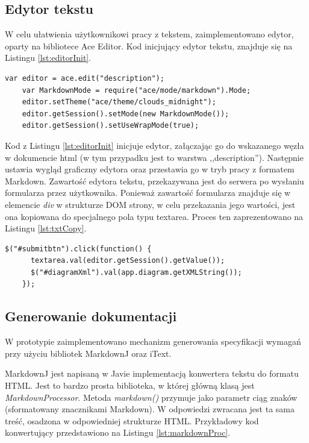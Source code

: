     \newpage

    \subsection{Edytor tekstu}
      W celu ułatwienia użytkownikowi pracy z tekstem, zaimplementowano edytor, oparty na bibliotece Ace Editor. 
      Kod inicjujący edytor tekstu, znajduje się na Listingu \ref{lst:editorInit}.

    \begin{lstlisting}[caption={Inicjalizacja edytora tekstu}, label={lst:editorInit}]
    var editor = ace.edit("description");
    var MarkdownMode = require("ace/mode/markdown").Mode;
    editor.setTheme("ace/theme/clouds_midnight");
    editor.getSession().setMode(new MarkdownMode());
    editor.getSession().setUseWrapMode(true);
    \end{lstlisting}

    Kod z Listingu \ref{lst:editorInit} inicjuje edytor, załączając go do wskazanego węzła w dokumencie html (w tym przypadku jest to warstwa ,,description''). Następnie ustawia wygląd graficzny edytora oraz przestawia go w tryb pracy z formatem Markdown.
    Zawartość edytora tekstu, przekazywana jest do serwera po wysłaniu formularza przez użytkownika. Ponieważ zawartość formularza znajduje się w elemencie \emph{div} w strukturze DOM strony, w celu przekazania jego wartości, jest ona kopiowana do specjalnego pola typu textarea. Proces ten zaprezentowano na Listingu \ref{lst:txtCopy}.

    \begin{lstlisting}[caption={Kopiowanie zawartości edytora tekstu do pola textarea}, label={lst:txtCopy}]
    $("#submitbtn").click(function() {
      textarea.val(editor.getSession().getValue()); 
      $("#diagramXml").val(app.diagram.getXMLString());
    });
    \end{lstlisting} 

    \subsection{Generowanie dokumentacji}
      
      W prototypie zaimplementowano mechanizm generowania specyfikacji wymagań przy użyciu bibliotek MarkdownJ oraz iText.

      MarkdownJ jest napisaną w Javie implementacją konwertera tekstu do formatu HTML. Jest to bardzo prosta biblioteka, w której główną klasą jest \emph{MarkdownProcessor}. Metoda \emph{markdown()} przymuje jako parametr ciąg znaków (sformatowany znacznikami Markdown). W odpowiedzi zwracana jest ta sama treść, osadzona w odpowiedniej strukturze HTML. Przykładowy kod konwertujący przedstawiono na Listingu \ref{lst:markdownProc}.

